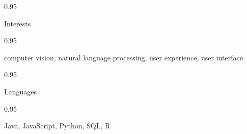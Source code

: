 \documentclass[a4paper,9pt]{article}
\newcommand{\doubleColumnGap}{\hspace{4mm}}
\newcommand{\withinSectionMarginBetween}{\vspace{-3ex}}
\newcommand{\mainLineSpacing}{0.95}
\begin{document}
\begin{minipage}[t]{0.20\linewidth}
  \begin{small}
    \begin{spacing}\mainLineSpacing{}
      \begin{flushright}
        Interests
      \end{flushright}
    \end{spacing}
  \end{small}
\end{minipage}
\doubleColumnGap{}
\begin{minipage}[t]{0.75\linewidth}
  \begin{small}
    \begin{spacing}\mainLineSpacing{}
      \begin{flushleft}
        computer vision, natural language processing, user experience, user interface
      \end{flushleft}
    \end{spacing}
  \end{small}
\end{minipage}

\withinSectionMarginBetween{}

\begin{minipage}[t]{0.20\linewidth}
  \begin{small}
    \begin{spacing}\mainLineSpacing{}
      \begin{flushright}
        Languages
      \end{flushright}
    \end{spacing}
  \end{small}
\end{minipage}
\doubleColumnGap{}
\begin{minipage}[t]{0.75\linewidth}
  \begin{small}
    \begin{spacing}\mainLineSpacing{}
      \begin{flushleft}
        Java, JavaScript, Python, SQL, R
      \end{flushleft}
    \end{spacing}
  \end{small}
\end{minipage}


\withinSectionMarginBetween{}
\end{document}
